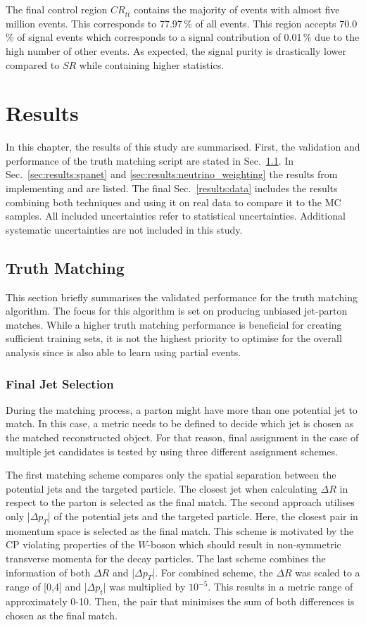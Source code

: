 \documentclass[bachelor,ngerman,english]{GAUBM}
\begin{document}
The final control region $CR_{t\bar{t}}$ contains the majority of events with almost five million events. This corresponds to 77.97\,\% of all events. This region accepts 70.0\,\% of signal events which corresponds to a signal contribution of 0.01\,\% due to the high number of other events. As expected, the signal purity is drastically lower compared to $SR$ while containing higher statistics. 


\chapter{Results}
\label{ch:results}
In this chapter, the results of this study are summarised. First, the validation and performance of the truth matching script are stated in Sec.~\ref{results:truth_matching}. In Sec.~\ref{sec:results:spanet} and \ref{sec:results:neutrino_weighting} the results from implementing \spanet and \NW are listed. The final Sec.~\ref{results:data} includes the results combining both techniques and using it on real data to compare it to the MC samples. All included uncertainties refer to statistical uncertainties. Additional systematic uncertainties are not included in this study. 

\section{Truth Matching}
\label{results:truth_matching}
This section briefly summarises the validated performance for the truth matching algorithm. The focus for this algorithm is set on producing unbiased jet-parton matches. While a higher truth matching performance is beneficial for creating sufficient training sets, it is not the highest priority to optimise for the overall analysis since \spanet is also able to learn using partial events.

\subsection*{Final Jet Selection}
During the matching process, a parton might have more than one potential jet to match. In this case, a metric needs to be defined to decide which jet is chosen as the matched reconstructed object. For that reason, final assignment in the case of multiple jet candidates is tested by using three different assignment schemes. 

The first matching scheme compares only the spatial separation between the potential jets and the targeted particle. The closest jet when calculating $\Delta R$ in respect to the parton is selected as the final match. The second approach utilises only |$\Delta p_T$| of the potential jets and the targeted particle. Here, the closest pair in momentum space is selected as the final match. This scheme is motivated by the CP violating properties of the $W$-boson which should result in non-symmetric transverse momenta for the decay particles. The last scheme combines the information of both $\Delta R$ and |$\Delta p_T$|. For combined scheme, the $\Delta R$ was scaled to a range of [0,4] and |$\Delta p_t$| was multiplied by $10^{-5}$. This results in a metric range of approximately 0-10. Then, the pair that minimises the sum of both differences is chosen as the final match.
\end{document}
